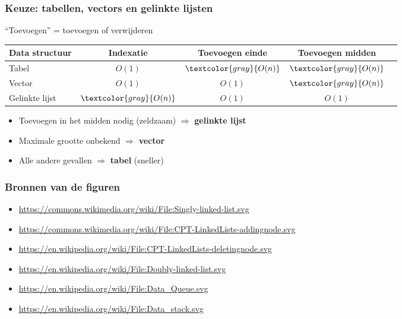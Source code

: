 \documentclass[12pt]{beamer}
\newcommand{\gray}{\textcolor{gray}}
\newcommand{\On}{\gray{O(n)}}
\begin{document}
\begin{frame}
\frametitle{Keuze: tabellen, vectors en gelinkte lijsten}
``Toevoegen'' = toevoegen of verwijderen
\begin{center}
\begin{tabu}{l|cccc}
\toprule
Data structuur & Indexatie & Toevoegen einde & Toevoegen midden \\
\midrule
Tabel & $O(1)$ & $\On$ & $\On$ \\
Vector& $O(1)$ & $O(1)$ & $\On$ \\
Gelinkte lijst & $\On$ & $O(1)$ & $O(1)$ \\
\bottomrule
\end{tabu}
\end{center}
\begin{itemize}
\item Toevoegen in het midden nodig (zeldzaam) $\Rightarrow$ \textbf{gelinkte lijst}
\item Maximale grootte onbekend $\Rightarrow$ \textbf{vector}
\item Alle andere gevallen $\Rightarrow$ \textbf{tabel} (sneller)
\end{itemize}
\end{frame}

\begin{frame}
\frametitle{Bronnen van de figuren}
\begin{itemize}
\item \url{https://commons.wikimedia.org/wiki/File:Singly-linked-list.svg}
\item \url{https://commons.wikimedia.org/wiki/File:CPT-LinkedLists-addingnode.svg}
\item \url{https://en.wikipedia.org/wiki/File:CPT-LinkedLists-deletingnode.svg}
\item \url{https://en.wikipedia.org/wiki/File:Doubly-linked-list.svg}
\item \url{https://en.wikipedia.org/wiki/File:Data_Queue.svg}
\item \url{https://en.wikipedia.org/wiki/File:Data_stack.svg}
\end{itemize}
\end{frame}
\end{document}
